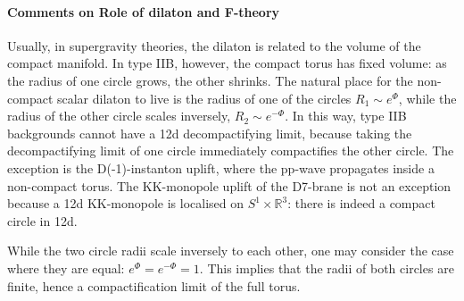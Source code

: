 

\paragraph{Comments on Role of dilaton and F-theory}
Usually, in supergravity theories, the dilaton is related to the volume of the compact manifold.
In type IIB, however, the compact torus has fixed volume: as the radius of one circle grows, the other shrinks.
The natural place for the non-compact scalar dilaton to live is the radius of one of the circles $R_1 \sim e^{\Phi}$, while the radius of the other circle scales inversely, $R_2 \sim e^{-\Phi}$.
In this way, type IIB backgrounds cannot have a 12d decompactifying limit, because taking the decompactifying limit of one circle immediately compactifies the other circle.
The exception is the D(-1)-instanton uplift, where the pp-wave propagates inside a non-compact torus.
The KK-monopole uplift of the D7-brane is not an exception because a 12d KK-monopole is localised on $S^1 \times \mathbb{R}^3$: there is indeed a compact circle in 12d.

While the two circle radii scale inversely to each other, one may consider the case where they are equal: $e^\Phi = e^{-\Phi} = 1$.
This implies that the radii of both circles are finite, hence a compactification limit of the full torus.
